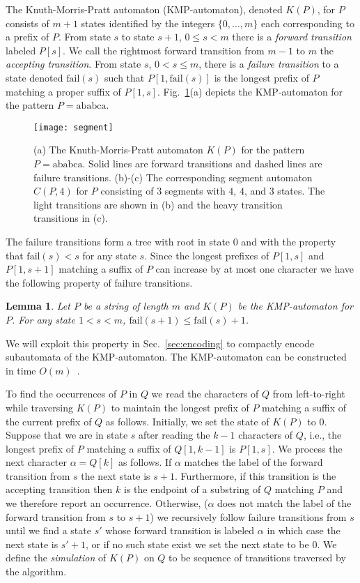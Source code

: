 \documentclass{article}
\newcommand{\fail}{\ensuremath{\mathrm{fail}}}
\newtheorem{lemma}{Lemma}
\begin{document}
The Knuth-Morris-Pratt automaton (KMP-automaton), denoted $K(P)$, for
$P$ consists of $m+1$ states identified by the integers $\{0, \ldots,
m\}$ each corresponding to a prefix of $P$. From state $s$ to state
$s+1$, $0 \leq s < m$ there is a \emph{forward transition} labeled
$P[s]$. We call the rightmost forward transition from $m-1$ to $m$ the
\emph{accepting transition}. From state $s$, $0 < s \leq m$, there is
a \emph{failure transition} to a state denoted $\fail(s)$ such that
$P[1,\fail(s)]$ is the longest prefix of $P$ matching a proper suffix
of $P[1,s]$. Fig.~\ref{fig:segment}(a) depicts the KMP-automaton for
the pattern $P = \text{ababca}$. \begin{figure}[t]
  \centering \texttt{[image: segment]}
  \caption{(a) The Knuth-Morris-Pratt automaton $K(P)$ for the pattern
    $P = \text{ababca}$. Solid lines are forward transitions and
    dashed lines are failure transitions. (b)-(c) The corresponding
    segment automaton $C(P, 4)$ for $P$ consisting of $3$ segments
    with $4$, $4$, and $3$ states. The light transitions are shown in
    (b) and the heavy transition transitions in (c).}
   \label{fig:segment}
\end{figure}

The failure transitions form a tree with root in state $0$ and with
the property that $\fail(s) < s$ for any state $s$. Since the longest
prefixes of $P[1, s]$ and $P[1,s+1]$ matching a suffix of $P$ can
increase by at most one character we have the following property of
failure transitions.
\begin{lemma}\label{lem:fail}
  Let $P$ be a string of length $m$ and $K(P)$ be the KMP-automaton
  for $P$. For any state $1 < s < m$, $\fail(s+1) \leq \fail(s) + 1$.
\end{lemma}
We will exploit this property in Sec.~\ref{sec:encoding} to
compactly encode subautomata of the KMP-automaton. The KMP-automaton
can be constructed in time $O(m)$~\cite{KMP1977}.


To find the occurrences of $P$ in $Q$ we read the characters of $Q$
from left-to-right while traversing $K(P)$ to maintain the longest
prefix of $P$ matching a suffix of the current prefix of $Q$ as
follows. Initially, we set the state of $K(P)$ to $0$. Suppose that we
are in state $s$ after reading the $k-1$ characters of $Q$, i.e., the
longest prefix of $P$ matching a suffix of $Q[1,k-1]$ is $P[1,s]$. We
process the next character $\alpha = Q[k]$ as follows. If $\alpha$
matches the label of the forward transition from $s$ the next state is
$s+1$. Furthermore, if this transition is the accepting transition
then $k$ is the endpoint of a substring of $Q$ matching $P$ and we
therefore report an occurrence. Otherwise, ($\alpha$ does not match
the label of the forward transition from $s$ to $s+1$) we recursively
follow failure transitions from $s$ until we find a state $s'$ whose
forward transition is labeled $\alpha$ in which case the next state is
$s'+1$, or if no such state exist we set the next state to be $0$. We
define the \emph{simulation} of $K(P)$ on $Q$ to be sequence of
transitions traversed by the algorithm.
\end{document}
